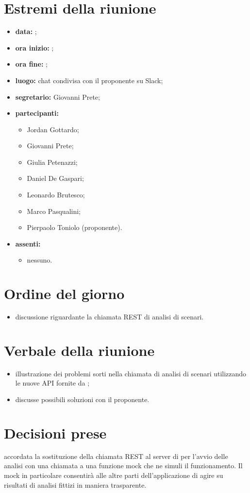 \documentclass[a4paper,11pt]{article}
\begin{document}
	\section{Estremi della riunione}
	\begin{itemize}
		\item \textbf{data:} ;
		\item \textbf{ora inizio:} ;
		\item \textbf{ora fine:} ;
		\item \textbf{luogo:} chat condivisa con il proponente su Slack;
		\item \textbf{segretario:} Giovanni Prete;
		\item \textbf{partecipanti:}
		\begin{itemize}
			 \item Jordan Gottardo;
			 \item Giovanni Prete;
			 \item Giulia Petenazzi;
			 \item Daniel De Gaspari;
			 \item Leonardo Brutesco;
			 \item Marco Pasqualini;
			 \item Pierpaolo Toniolo (proponente).
		\end{itemize}
		\item \textbf{assenti:}
			\begin{itemize}
				\item nessuno.
			\end{itemize}
	\end{itemize}
	\section{Ordine del giorno}
		\begin{itemize}
			\item discussione riguardante la chiamata REST di analisi di scenari.
		\end{itemize}
	\section{Verbale della riunione}
	\begin{itemize}
		\item illustrazione dei problemi sorti nella chiamata di analisi di scenari \riskapp{} utilizzando le nuove API fornite da \riskapp;
		\item discusse possibili soluzioni con il proponente.
	\end{itemize}
	\section{Decisioni prese}
	\begin{itemize}
		\itemVE accordata la sostituzione della chiamata REST al server di \riskapp{} per l'avvio delle analisi con una chiamata a una funzione mock che ne simuli il funzionamento. Il mock in particolare consentirà alle altre parti dell'applicazione di agire su risultati di analisi fittizi in maniera trasparente.
	\end{itemize}
\end{document}
